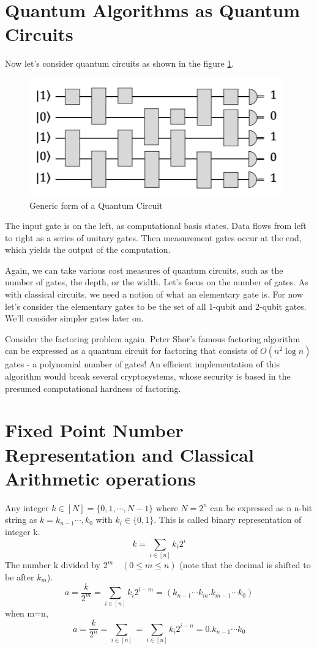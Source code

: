 \documentclass[12pt, oneside]{book}
\theoremstyle{definition}
\theoremstyle{definition}
\theoremstyle{remark}
\begin{document}
\section{Quantum Algorithms as Quantum Circuits}
Now let's consider quantum circuits as shown in the figure \ref{fig:quantum-circ}.
\begin{figure}[H]
    \centering
    \includegraphics[width=0.5\linewidth]{../images/quantum-circ.png}
    \caption{Generic form of a Quantum Circuit}
    \label{fig:quantum-circ}
\end{figure}
The input gate is on the left, as computational basis states. Data flows from left to right as a series of unitary gates. Then measurement gates occur at the end, which yields the output of the computation.

Again, we can take various cost measures of quantum circuits, such as the number of gates, the depth, or the width. Let's focus on the number of gates. As with classical circuits, we need a notion of what an elementary gate is. For now let's consider the elementary gates to be the set of all 1-qubit and 2-qubit gates. We'll consider simpler gates later on.

Consider the factoring problem again. Peter Shor's famous factoring algorithm can be expressed as a quantum circuit for factoring that consists of $O(n^2 \log n)$ gates - a polynomial number of gates! An efficient implementation of this algorithm would break several cryptosystems, whose security is based in the presumed computational hardness of factoring.





 

 
\section{Fixed Point Number Representation and Classical Arithmetic operations}
Any integer $k \in [N]=\{0,1,\cdots,N-1\}$ where $N=2^n$ can be expressed as n n-bit string as
$k=k_{n-1}\cdots ,k_0$  with $k_i \in \{0,1\}$. This is called binary representation of integer k.
\[
k=\sum_{i \in [n]}k_i2^i
\]
The number k divided by $2^m \quad (0\leq m\leq n)$ (note that the decimal is shifted to be after $k_m$).
\[
a=\frac{k}{2^m}=\sum_{i\in [n]}k_i2^{i-m}=(k_{n-1}\cdots k_m.k_{m-1}\cdots k_0)\]
when m=n,
\[
a=\frac{k}{2^n}=\sum_{i\in [n]}=\sum_{i\in[n]}k_i2^{i-n}=0.k_{n-1}\cdots k_0
\]
 
\end{document}
